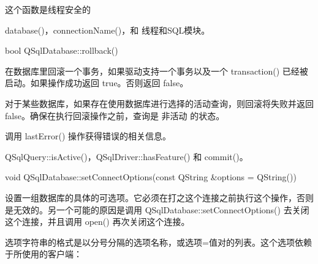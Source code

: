 \begin{notice}
这个函数是线程安全的
\end{notice}

\begin{notice}[另请查阅]
database()，connectionName()，和 线程和SQL模块。
\end{notice}

bool QSqlDatabase::rollback()


在数据库里回滚一个事务，如果驱动支持一个事务以及一个 transaction() 已经被启动。如果操作成功返回 true。否则返回 false。

\begin{notice}
对于某些数据库，如果存在使用数据库进行选择的活动查询，则回滚将失败并返回false。确保在执行回滚操作之前，查询是 非活动 的状态。
\end{notice}

调用 lastError() 操作获得错误的相关信息。

\begin{notice}[另请查阅]
QSqlQuery::isActive()，QSqlDriver::hasFeature() 和 commit()。
\end{notice}



void QSqlDatabase::setConnectOptions(const QString \&options = QString())


设置一组数据库的具体的可选项。它必须在打之这个连接之前执行这个操作，否则是无效的。另一个可能的原因是调用 QSqlDatabase::setConnectOptions() 去关闭这个连接，并且调用 open() 再次关闭这个连接。

选项字符串的格式是以分号分隔的选项名称，或选项=值对的列表。这个选项依赖于所使用的客户端：

